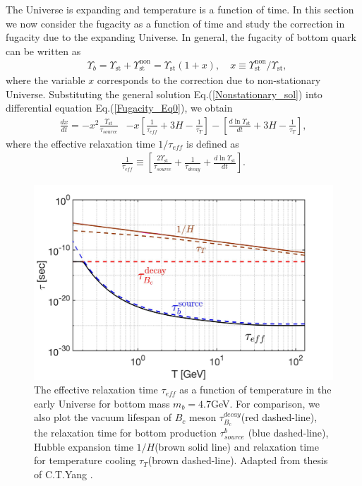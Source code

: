 The Universe is expanding and temperature is a function of time. In this section we now consider the fugacity as a function of time and study the correction in fugacity due to the expanding Universe. In general, the fugacity of bottom quark can be written as 
\begin{align}\label{Nonstationary_sol}
&\Upsilon_b=\Upsilon_{\mathrm{st}}+\Upsilon^{\mathrm{non}}_{\mathrm{st}}=\Upsilon_\mathrm{st}\left(1+x\right),\quad x\equiv{\Upsilon_\mathrm{st}^{\mathrm{non}}}/{\Upsilon_\mathrm{st}},
\end{align}
where the variable $x$ corresponds to the correction due to non-stationary Universe. Substituting the general solution Eq.(\ref{Nonstationary_sol}) into differential equation Eq.(\ref{Fugacity_Eq0}), we obtain
\begin{align}\label{Nonstationary_eq}
\frac{dx}{dt}=-x^2\frac{\Upsilon_\mathrm{st}}{\tau_{source}}&-x\left[\frac{1}{\tau_{eff}}+3H-\frac{1}{\tau_T}\right]-\left[\frac{d\ln\Upsilon_\mathrm{st}}{dt}+3H-\frac{1}{\tau_T}\right],
\end{align}
where the effective relaxation time $1/\tau_{eff}$ is defined as
\begin{align}
\frac{1}{\tau_{eff}}\equiv\left[\frac{2\Upsilon_\mathrm{st}}{\tau_{source}}+\frac{1}{\tau_{decay}}+\frac{d\ln\Upsilon_\mathrm{st}}{dt}\right].
\end{align}
\begin{figure}[t]
\begin{center}
\includegraphics[width=\textwidth]{./plots/Tau_RelaxationTime002}
\caption{The effective relaxation time $\tau_{eff}$ as a function of temperature in the early Universe for bottom mass $m_b=4.7$GeV.  For comparison, we also plot the vacuum lifespan of $B_c$ meson $\tau_{B_c}^{decay}$(red dashed-line), the relaxation time for bottom production $\tau^b_{source}$ (blue dashed-line), Hubble expansion time $1/H$(brown solid line) and relaxation time for temperature cooling $\tau_T$(brown dashed-line). Adapted from thesis of C.T.Yang \cite{Yang:2024ret}.}
\label{RelaxationTime_eff}
\end{center}
\end{figure}
